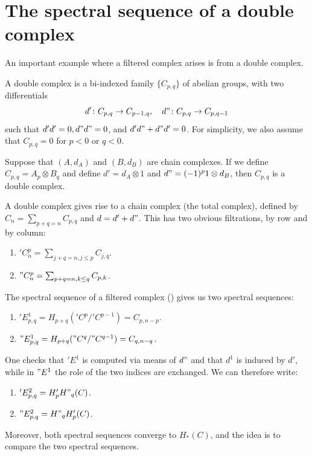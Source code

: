 \documentclass[ma3408.tex]{subfiles}
\begin{document}
\section{The spectral sequence of a double complex}
An important example where a filtered complex arises is from a double complex. 
\begin{Def}
	A double complex is a bi-indexed family $\{ C_{p,q} \}$ of abelian groups, with two differentials
	\[
d' \colon C_{p,q} \to C_{p-1,q}, \quad d" \colon C_{p,q} \to C_{p,q-1}
	\]
	such that $d'd' = 0, d"d" = 0$, and $d'd" + d"d' = 0$. For simplicity, we also assume that $C_{p,q} = 0$ for $p< 0$ or $q<0$.
\end{Def}
\begin{Exa}\label{exa:double_complex_cc}
Suppose that $(A,d_A)$ and $(B,d_B)$ are chain complexes. If we define $C_{p,q} = A_p \otimes B_q$ and define $d' = d_A \otimes 1$ and $d" = (-1)^p1 \otimes d_B$, then $C_{p,q}$ is a double complex. 
\end{Exa}
\begin{Cons}
A double complex gives rise to a chain complex (the total complex), defined by $C_n = \sum_{p+q = n} C_{p,q}$ and $d = d' + d"$. This has two obvious filtrations, by row and by column:
\begin{enumerate}
	\item ${}'C^p_n = \sum_{j+q = n, j \le p} C_{j,q}$.
	\item ${}"C^p_n = \sum_{p+q = n, k \le q} C_{p,k}$.
\end{enumerate}
The spectral sequence of a filtered complex () gives us two spectral sequences:
\begin{enumerate}
	\item ${}'E^1_{p,q} = H_{p+q}('C^p/'C^{p-1}) = C_{p,n-p}$.
	\item ${}"E^1_{p,q} = H_{p+q}("C^q/"C^{q-1}) = C_{q,n-q}$.
\end{enumerate}
One checks that $'E^1$ is computed via means of $d"$ and that $d^1$ is induced by $d'$, while in $"E^1$ the role of the two indices are exchanged. We can therefore write:
\begin{enumerate}
	\item ${}'E^2_{p,q} = H'_pH"_q(C)$.
	\item ${}"E^2_{p,q} = H"_qH'_p(C)$.
\end{enumerate}
Moreover, both spectral sequences converge to $H_*(C)$, and the idea is to compare the two spectral sequences. 
\end{Cons}
\end{document}
